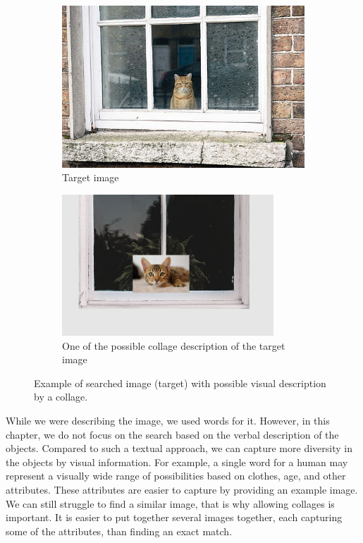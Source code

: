 \begin{figure}
\centering

\begin{subfigure}[t]{0.45\textwidth}
\includegraphics[width=0.9\linewidth]{img/cat_on_window} 
\caption{Target image}
\label{fig:searched_scene}
\end{subfigure}
\begin{subfigure}[t]{0.45\textwidth}
\includegraphics[width=0.9\linewidth]{img/cat_on_window_collage}
\caption{One of the possible collage description of the target image}
\label{fig:collage_example}
\end{subfigure}

\caption{Example of searched image (target) with possible visual description by a collage.}
\label{fig:query_collage_comparison}
\end{figure}

While we were describing the image, we used words for it. However, in this chapter, we do not focus on the search based on the verbal description of the objects. Compared to such a textual approach, we can capture more diversity in the objects by visual information. For example, a single word for a human may represent a visually wide range of possibilities based on clothes, age, and other attributes. These attributes are easier to capture by providing an example image. We can still struggle to find a similar image, that is why allowing collages is important. It is easier to put together several images together, each capturing some of the attributes, than finding an exact match.

